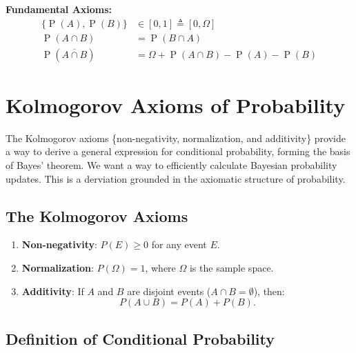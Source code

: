 \documentclass[
  12 pt,
  a4paper,
]{book}
\providecommand{\tightlist}{%
  \setlength{\itemsep}{0pt}\setlength{\parskip}{0pt}}
\numberwithin{equation}{section}
\theoremstyle{plain}      %
\theoremstyle{definition} %
\theoremstyle{remark}     %
\theoremstyle{note}         %
\begin{document}
\textbf{Fundamental Axioms:} \[\begin{aligned}
\{\operatorname{P}(A), \operatorname{P}(B)\} &\in[0,1] \triangleq [0 , \Omega] \\ 
\operatorname{P}(A \cap B)&=\operatorname{P}(B \cap A)\\
\operatorname{P}(\overline{A \cap B}) &= \Omega + \operatorname{P}(A \cap B) - \operatorname{P}(A) - \operatorname{P}(B)
\end{aligned}\]

\newpage

\newpage

\hypertarget{kolmogorov-axioms-of-probability}{%
\section{Kolmogorov Axioms of
Probability}\label{kolmogorov-axioms-of-probability}}

The Kolmogorov axioms \{non-negativity, normalization, and additivity\}
provide a way to derive a general expression for conditional
probability, forming the basis of Bayes' theorem. We want a way to
efficiently calculate Bayesian probability updates. This is a derviation
grounded in the axiomatic structure of probability.

\hypertarget{the-kolmogorov-axioms}{%
\subsection{The Kolmogorov Axioms}\label{the-kolmogorov-axioms}}

\begin{enumerate}
\def\labelenumi{\arabic{enumi}.}
\tightlist
\item
  \textbf{Non-negativity}: \(P(E) \geq 0\) for any event \(E\).
\item
  \textbf{Normalization}: \(P(\Omega) = 1\), where \(\Omega\) is the
  sample space.
\item
  \textbf{Additivity}: If \(A\) and \(B\) are disjoint events
  (\(A \cap B = \emptyset\)), then: \[
  P(A \cup B) = P(A) + P(B).
  \]
\end{enumerate}

\hypertarget{definition-of-conditional-probability}{%
\subsection{Definition of Conditional
Probability}\label{definition-of-conditional-probability}}
\end{document}
